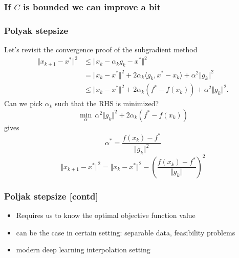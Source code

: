 \documentclass{beamer}
\begin{document}
\begin{frame}
  \frametitle{If $C$ is bounded we can improve a bit}

\end{frame}


\begin{frame}
  \frametitle{Polyak stepsize}
  Let's revisit the convergence proof of the subgradient method
  \begin{equation}
    \begin{aligned}
      \Vert x_{k+1} - x^* \Vert^2 &\le \Vert x_k - \alpha_k g_k - x^* \Vert^2 \\
      &= \Vert x_k-x^* \Vert^2 + 2 \alpha_k \langle g_k, x^*-x_k \rangle + \alpha^2 \Vert g_k \Vert^2\\
      &\le \Vert x_k-x^* \Vert^2 + 2 \alpha_k (f^* - f(x_k))+ \alpha^2 \Vert g_k \Vert^2.
    \end{aligned}
  \end{equation}
  Can we pick $\alpha_k$ such that the RHS is minimized?
  \begin{equation}
    \min_\alpha \, \alpha^2 \Vert g_k \Vert^2 + 2 \alpha_k (f^* - f(x_k))
  \end{equation}
  gives
  \begin{equation}
    \alpha^* = \frac{f(x_k)-f^*}{\Vert g_k \Vert^2}
  \end{equation}
  \begin{equation}
      \Vert x_{k+1} - x^* \Vert^2 = \Vert x_k-x^* \Vert^2 - {\left( \frac{f(x_k)-f^*}{\Vert g_k \Vert} \right)}^2
  \end{equation}
\end{frame}

\begin{frame}
  \frametitle{Poljak stepsize [contd]}
  \textit{}
  \begin{itemize}
    \item Requires us to know the optimal objective function value
    \item can be the case in certain setting:
          separable data, feasibility problems
    \item modern deep learning interpolation setting
  \end{itemize}


\end{frame}
\end{document}
